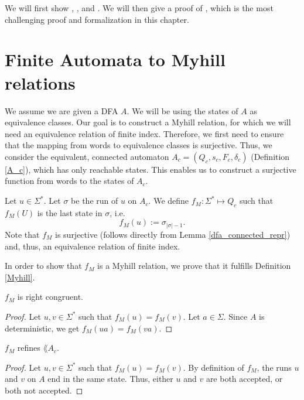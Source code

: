 We will first show , , and .
We will then give a proof of , which is the most challenging proof and formalization in this chapter.



\section{Finite Automata to Myhill relations}
We assume we are given a DFA $A$. 
We will be using the states of $A$ as equivalence classes.
Our goal is to construct a Myhill relation, for which we will need an equivalence relation of finite index.
Therefore, we first need to ensure that the mapping from words to equivalence classes is surjective.
Thus, we consider the equivalent, connected automaton $A_c=(Q_c, s_c, F_c, \delta_c)$ (Definition \ref{A_c}), which has only reachable states.
This enables us to construct a surjective function from words to the states of $A_c$.

\begin{definition}
    \label{f_M} 
    Let $u \in \Sigma^*$. 
    Let $\sigma$ be the run of $u$ on $A_c$. 
    We define $f_M: \Sigma^* \mapsto Q_c$ such that $f_M(U)$ is the last state in $\sigma$, i.e.
    \begin{equation*}
        f_M(u) := \sigma_{|\sigma|-1}.
    \end{equation*}
    Note that $f_M$ is surjective (follows directly from Lemma \ref{dfa_connected_repr}) 
    and, thus, an equivalence relation of finite index.
\end{definition}



In order to show that $f_M$ is a Myhill relation, we prove that it fulfills Definition \ref{Myhill}.

\begin{lemma}
    \label{f_M_right_congruent}
    $f_M$ is right congruent.
\end{lemma}
\begin{proof}
    Let $u,v \in \Sigma^*$ such that ${f_M}(u) = {f_M}(v)$.
    Let $a \in \Sigma$. Since $A$ is deterministic, we get ${f_M}(ua) = {f_M}(va)$.
\end{proof}

\begin{lemma}
    \label{f_M_refines}
    $f_M$ refines $\lang{A_c}$.
\end{lemma}
\begin{proof}
    Let $u,v \in \Sigma^*$ such that ${f_M}(u) = {f_M}(v)$.
    By definition of $f_M$, the runs $u$ and $v$ on $A$ end in the same state.
    Thus, either $u$ and $v$ are both accepted, or both not accepted.
\end{proof}

